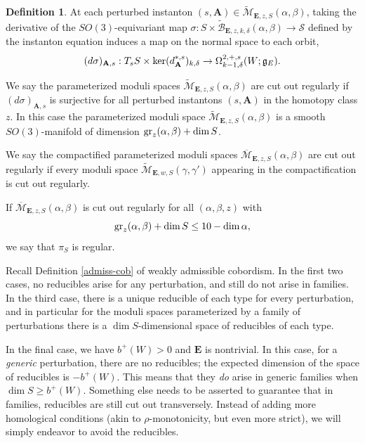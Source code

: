 \documentclass[10pt,a4paper]{amsart}
\theoremstyle{definition}
\newtheorem{definition}[theorem]{Definition}
\theoremstyle{remark}
\numberwithin{figure}{qchap}
\begin{document}
\begin{definition}\label{regfamily}At each perturbed instanton $(s, \mathbf{A}) \in \widetilde{\mathcal M}_{\mathbf{E},z,S}(\alpha, \beta)$, taking the derivative of the $SO(3)$-equivariant map $\sigma: S \times \widetilde{\mathcal B}_{\mathbf{E}, z,k,\delta}(\alpha, \beta) \to \mathcal S$ defined by the instanton equation induces a map on the normal space to each orbit, $$(d\sigma)_{\mathbf{A}, s}: T_s S \times \textup{ker}(d_{\mathbf{A}}^{*,s})_{k,\delta} \to \Omega^{2,{+,s}}_{k-1,\delta}(W;\mathfrak g_E).$$

We say the parameterized moduli spaces $\widetilde{\mathcal M}_{\mathbf{E},z,S}(\alpha, \beta)$ are cut out regularly if $(d\sigma)_{\mathbf{A},s}$ is surjective for all perturbed instantons $(s,\mathbf{A})$ in the homotopy class $z$. In this case the parameterized moduli space $\widetilde{\mathcal M}_{\mathbf{E},z,S}(\alpha, \beta)$ is a smooth $SO(3)$-manifold of dimension $\textup{gr}_z(\alpha, \beta) + \dim S$.

We say the compactified parameterized moduli spaces $\overline{\mathcal M}_{\mathbf{E},z,S}(\alpha, \beta)$ are cut out regularly if every moduli space $\widetilde{\mathcal M}_{\mathbf{E},w,S}(\gamma, \gamma')$ appearing in the compactification is cut out regularly.

If $\overline{\mathcal M}_{\mathbf{E},z,S}(\alpha, \beta)$ is cut out regularly for all $(\alpha, \beta, z)$ with
$$\textup{gr}_z(\alpha, \beta) + \dim S \leq 10 - \dim \alpha,$$
we say that $\pi_S$ is regular.
\end{definition}

Recall Definition \ref{admiss-cob} of weakly admissible cobordism. In the first two cases, no reducibles arise for any perturbation, and still do not arise in families. In the third case, there is a unique reducible of each type for every perturbation, and in particular for the moduli spaces parameterized by a family of perturbations there is a $\dim S$-dimensional space of reducibles of each type.

In the final case, we have $b^+(W) > 0$ and $\mathbf{E}$ is nontrivial. In this case, for a \emph{generic} perturbation, there are no reducibles; the expected dimension of the space of reducibles is $-b^+(W)$. This means that they \emph{do} arise in generic families when $\dim S \geq b^+(W)$. Something else needs to be asserted to guarantee that in families, reducibles are still cut out transversely. Instead of adding more homological conditions (akin to $\rho$-monotonicity, but even more strict), we will simply endeavor to avoid the reducibles.
\end{document}
